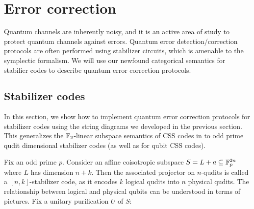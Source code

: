 \section{Error correction}
\label{sec:qec}


Quantum channels are inherently noisy, and it is an active area of study to protect quantum channels against errors.  Quantum error detection/correction protocols are often performed using stabilizer circuits, which is amenable to the symplectic formalism.  We will use our newfound categorical semantics for stabilier codes to describe quantum error correction protocols. 

\subsection{Stabilizer codes}


In this section, we show how to implement quantum error correction protocols for stabilizer codes using the string diagrams we developed in the previous section.   This generalizes the $\mathbb{F}_2$-linear subspace semantics of CSS codes in \cite{grok} to odd prime qudit dimensional stabilizer codes (as well as for qubit CSS codes).


Fix an odd prime $p$.
Consider an affine coisotropic subspace $S=L+a \subseteq \mathbb{F}_p^{2n}$ where $L$ has dimension $n+k$.  Then the associated projector on $n$-qudits is called a $[n,k]$-stabilizer code, as it encodes $k$ logical qudits into $n$ physical qudits. 
The relationship between logical and physical qubits can be understood in terms of pictures.
Fix a unitary purification $U$ of $S$:

